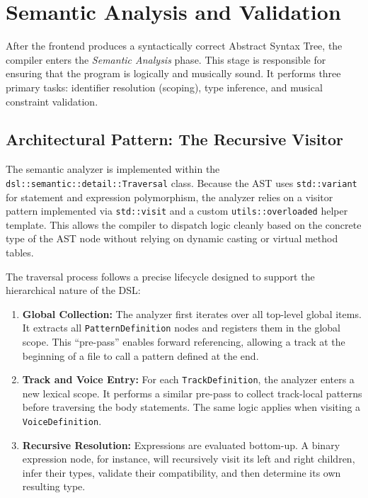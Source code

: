 \section{Semantic Analysis and Validation}\label{sec:implementation-semantic}

After the frontend produces a syntactically correct Abstract Syntax Tree, the compiler enters the \textit{Semantic
Analysis} phase.
This stage is responsible for ensuring that the program is logically and musically sound.
It performs three primary tasks: identifier resolution (scoping), type inference, and musical constraint validation.

\subsection{Architectural Pattern: The Recursive Visitor}\label{subsec:architectural-pattern:-the-recursive-visitor}

The semantic analyzer is implemented within the \texttt{dsl::semantic::detail::Traversal} class.
Because the AST uses \texttt{std::variant} for statement and expression polymorphism, the analyzer relies on a visitor
pattern implemented via \texttt{std::visit} and a custom \texttt{utils::overloaded} helper template.
This allows the compiler to dispatch logic cleanly based on the concrete type of the AST node without relying on dynamic
casting or virtual method tables.

The traversal process follows a precise lifecycle designed to support the hierarchical nature of the DSL\@:
\begin{enumerate}
  \item \textbf{Global Collection:} The analyzer first iterates over all top-level global items.
    It extracts all \texttt{PatternDefinition} nodes and registers them in the global scope.
    This ``pre-pass'' enables forward referencing, allowing a track at the beginning of a file to call a pattern defined
    at the end.
  \item \textbf{Track and Voice Entry:} For each \texttt{TrackDefinition}, the analyzer enters a new lexical scope.
    It performs a similar pre-pass to collect track-local patterns before traversing the body statements.
    The same logic applies when visiting a \texttt{VoiceDefinition}.
  \item \textbf{Recursive Resolution:} Expressions are evaluated bottom-up.
    A binary expression node, for instance, will recursively visit its left and right children, infer their types,
    validate their compatibility, and then determine its own resulting type.
\end{enumerate}

